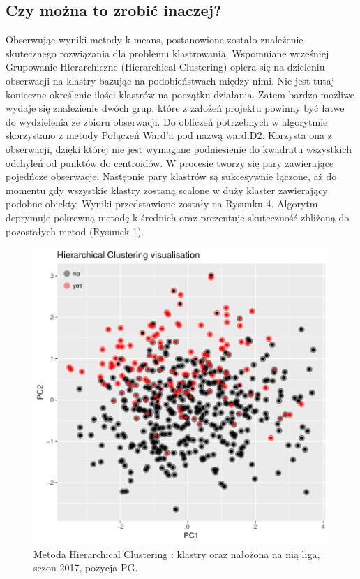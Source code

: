 \documentclass[twoside,twocolumn]{article}
\begin{document}
\subsection{Czy można to zrobić inaczej?}

\indent Obserwując wyniki metody k-means, postanowione zostało znaleźenie skutecznego rozwiązania dla problemu klastrowania. Wspomniane wcześniej Grupowanie Hierarchiczne (Hierarchical Clustering) opiera się na dzieleniu obserwacji na klastry bazując na podobieństwach między nimi. Nie jest tutaj konieczne określenie ilości klastrów na początku działania. Zatem bardzo możliwe wydaje się znalezienie dwóch grup, które z założeń projektu powinny być łatwe do wydzielenia ze zbioru obserwacji. Do obliczeń potrzebnych w algorytmie  skorzystano z metody Połączeń Ward'a pod nazwą ward.D2. Korzysta ona z obserwacji, dzięki której nie jest wymagane podniesienie do kwadratu wszystkich odchyleń od punktów do centroidów. W procesie tworzy się pary zawierające pojedńcze obserwacje. Następnie pary klastrów są sukcesywnie łączone, aż do momentu gdy wszystkie klastry zostaną scalone w duży klaster zawierający podobne obiekty. Wyniki przedstawione zostały na Rysunku 4. Algorytm deprymuje pokrewną metodę k-średnich oraz prezentuje skuteczność zbliżoną do pozostałych metod (Rysunek 1).

\begin{figure}[hbt!]
  \centering
    \includegraphics[width=\linewidth]{plot_hclust.pdf}
  \caption{Metoda Hierarchical Clustering : klastry oraz nałożona na nią liga, sezon 2017, pozycja PG.}
  \label{fig:coffee}
\end{figure}
\end{document}
